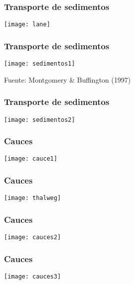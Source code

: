 \documentclass{beamer}
\begin{document}
\begin{frame}
\frametitle{Transporte de sedimentos}
\begin{center}
   	\texttt{[image: lane]}
\end{center}
\end{frame}
\begin{frame}
\frametitle{Transporte de sedimentos}
\begin{center}
   	\texttt{[image: sedimentos1]}
\end{center}
\tiny{Fuente: Montgomery \& Buffington (1997)}
\end{frame}
\begin{frame}
\frametitle{Transporte de sedimentos}
\begin{center}
   	\texttt{[image: sedimentos2]}
\end{center}
\end{frame}
\begin{frame}
\frametitle{Cauces}
\begin{center}
   	\texttt{[image: cauce1]}
\end{center}
\end{frame}
\begin{frame}
\frametitle{Cauces}
\begin{center}
   	\texttt{[image: thalweg]}
\end{center}
\end{frame}
\begin{frame}
\frametitle{Cauces}
\begin{center}
   	\texttt{[image: cauces2]}
\end{center}
\end{frame}
\begin{frame}
\frametitle{Cauces}
\begin{center}
   	\texttt{[image: cauces3]}
\end{center}
\end{frame}
\end{document}

